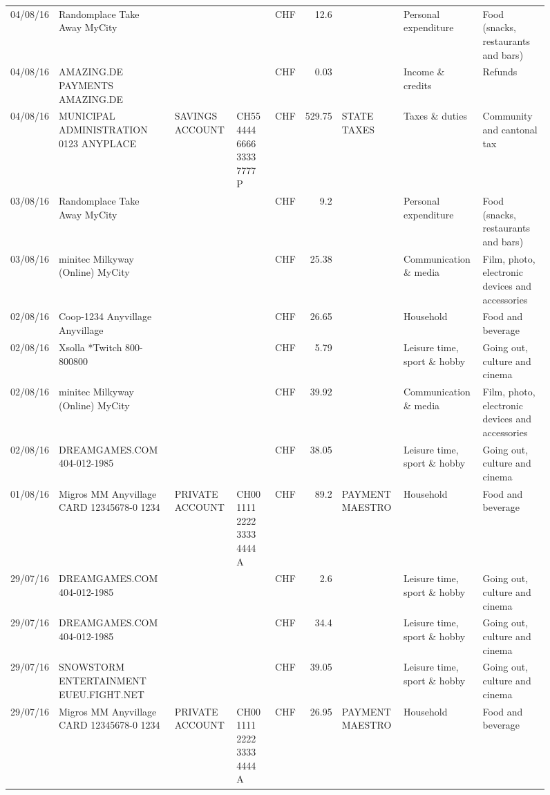 \begin{landscape}
\begin{sidewaysfigure}
\begin{table}[h]
\begin{center}
\begin{tabular}{rllllrlll}
		04/08/16 & Randomplace Take Away     MyCity &       &       & CHF   & 12.6  &       & Personal expenditure & Food (snacks, restaurants and bars) \\
		04/08/16 & AMAZING.DE PAYMENTS       AMAZING.DE &       &       & CHF   & 0.03  &       & Income \& credits & Refunds \\
		04/08/16 & MUNICIPAL ADMINISTRATION 0123 ANYPLACE & SAVINGS ACCOUNT & CH55 4444 6666 3333 7777 P & CHF   & 529.75 & STATE TAXES & Taxes \& duties & Community and cantonal tax \\
		03/08/16 & Randomplace Take Away     MyCity &       &       & CHF   & 9.2   &       & Personal expenditure & Food (snacks, restaurants and bars) \\
		03/08/16 & minitec Milkyway (Online) MyCity &       &       & CHF   & 25.38 &       & Communication \& media & Film, photo, electronic devices and accessories \\
		02/08/16 & Coop-1234 Anyvillage    Anyvillage &       &       & CHF   & 26.65 &       & Household & Food and beverage \\
		02/08/16 & Xsolla *Twitch           800-800800 &       &       & CHF   & 5.79  &       & Leisure time, sport \& hobby & Going out, culture and cinema \\
		02/08/16 & minitec Milkyway (Online) MyCity &       &       & CHF   & 39.92 &       & Communication \& media & Film, photo, electronic devices and accessories \\
		02/08/16 & DREAMGAMES.COM           404-012-1985 &       &       & CHF   & 38.05 &       & Leisure time, sport \& hobby & Going out, culture and cinema \\
		01/08/16 & Migros MM Anyvillage CARD 12345678-0 1234 & PRIVATE ACCOUNT & CH00 1111 2222 3333 4444 A & CHF   & 89.2  & PAYMENT MAESTRO & Household & Food and beverage \\
		29/07/16 & DREAMGAMES.COM           404-012-1985 &       &       & CHF   & 2.6   &       & Leisure time, sport \& hobby & Going out, culture and cinema \\
		29/07/16 & DREAMGAMES.COM           404-012-1985 &       &       & CHF   & 34.4  &       & Leisure time, sport \& hobby & Going out, culture and cinema \\
		29/07/16 & SNOWSTORM ENTERTAINMENT EUEU.FIGHT.NET &       &       & CHF   & 39.05 &       & Leisure time, sport \& hobby & Going out, culture and cinema \\
		29/07/16 & Migros MM Anyvillage CARD 12345678-0 1234 & PRIVATE ACCOUNT & CH00 1111 2222 3333 4444 A & CHF   & 26.95 & PAYMENT MAESTRO & Household & Food and beverage \\

\end{tabular}
\end{center}
\end{table}
\end{sidewaysfigure}
\end{landscape}
